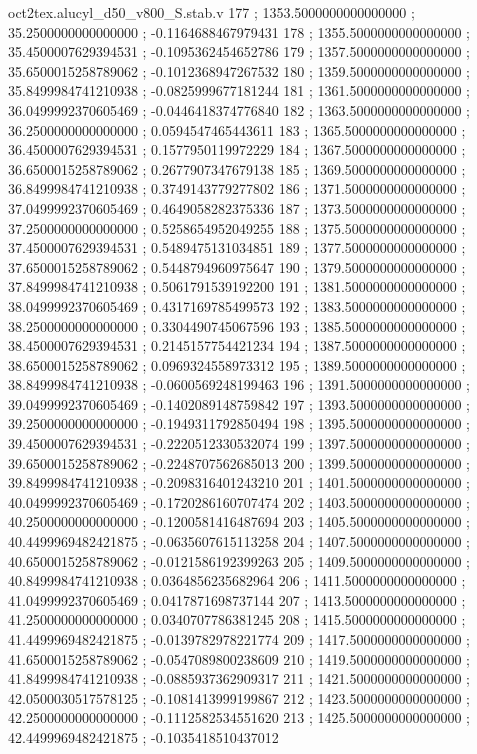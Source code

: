\begin{filecontents}[overwrite]{oct2tex.alucyl_d50_v800_S.stab.v}
177 ; 1353.5000000000000000 ; 35.2500000000000000 ; -0.1164688467979431
178 ; 1355.5000000000000000 ; 35.4500007629394531 ; -0.1095362454652786
179 ; 1357.5000000000000000 ; 35.6500015258789062 ; -0.1012368947267532
180 ; 1359.5000000000000000 ; 35.8499984741210938 ; -0.0825999677181244
181 ; 1361.5000000000000000 ; 36.0499992370605469 ; -0.0446418374776840
182 ; 1363.5000000000000000 ; 36.2500000000000000 ; 0.0594547465443611
183 ; 1365.5000000000000000 ; 36.4500007629394531 ; 0.1577950119972229
184 ; 1367.5000000000000000 ; 36.6500015258789062 ; 0.2677907347679138
185 ; 1369.5000000000000000 ; 36.8499984741210938 ; 0.3749143779277802
186 ; 1371.5000000000000000 ; 37.0499992370605469 ; 0.4649058282375336
187 ; 1373.5000000000000000 ; 37.2500000000000000 ; 0.5258654952049255
188 ; 1375.5000000000000000 ; 37.4500007629394531 ; 0.5489475131034851
189 ; 1377.5000000000000000 ; 37.6500015258789062 ; 0.5448794960975647
190 ; 1379.5000000000000000 ; 37.8499984741210938 ; 0.5061791539192200
191 ; 1381.5000000000000000 ; 38.0499992370605469 ; 0.4317169785499573
192 ; 1383.5000000000000000 ; 38.2500000000000000 ; 0.3304490745067596
193 ; 1385.5000000000000000 ; 38.4500007629394531 ; 0.2145157754421234
194 ; 1387.5000000000000000 ; 38.6500015258789062 ; 0.0969324558973312
195 ; 1389.5000000000000000 ; 38.8499984741210938 ; -0.0600569248199463
196 ; 1391.5000000000000000 ; 39.0499992370605469 ; -0.1402089148759842
197 ; 1393.5000000000000000 ; 39.2500000000000000 ; -0.1949311792850494
198 ; 1395.5000000000000000 ; 39.4500007629394531 ; -0.2220512330532074
199 ; 1397.5000000000000000 ; 39.6500015258789062 ; -0.2248707562685013
200 ; 1399.5000000000000000 ; 39.8499984741210938 ; -0.2098316401243210
201 ; 1401.5000000000000000 ; 40.0499992370605469 ; -0.1720286160707474
202 ; 1403.5000000000000000 ; 40.2500000000000000 ; -0.1200581416487694
203 ; 1405.5000000000000000 ; 40.4499969482421875 ; -0.0635607615113258
204 ; 1407.5000000000000000 ; 40.6500015258789062 ; -0.0121586192399263
205 ; 1409.5000000000000000 ; 40.8499984741210938 ; 0.0364856235682964
206 ; 1411.5000000000000000 ; 41.0499992370605469 ; 0.0417871698737144
207 ; 1413.5000000000000000 ; 41.2500000000000000 ; 0.0340707786381245
208 ; 1415.5000000000000000 ; 41.4499969482421875 ; -0.0139782978221774
209 ; 1417.5000000000000000 ; 41.6500015258789062 ; -0.0547089800238609
210 ; 1419.5000000000000000 ; 41.8499984741210938 ; -0.0885937362909317
211 ; 1421.5000000000000000 ; 42.0500030517578125 ; -0.1081413999199867
212 ; 1423.5000000000000000 ; 42.2500000000000000 ; -0.1112582534551620
213 ; 1425.5000000000000000 ; 42.4499969482421875 ; -0.1035418510437012

\end{filecontents}
